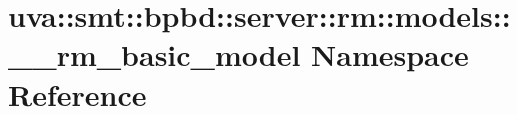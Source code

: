 \hypertarget{namespaceuva_1_1smt_1_1bpbd_1_1server_1_1rm_1_1models_1_1____rm__basic__model}{}\section{uva\+:\+:smt\+:\+:bpbd\+:\+:server\+:\+:rm\+:\+:models\+:\+:\+\_\+\+\_\+rm\+\_\+basic\+\_\+model Namespace Reference}
\label{namespaceuva_1_1smt_1_1bpbd_1_1server_1_1rm_1_1models_1_1____rm__basic__model}
